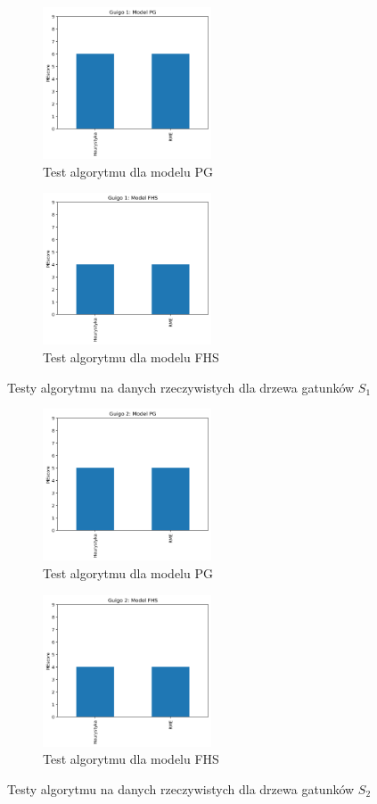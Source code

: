 \documentclass[licencjacka]{pracamgr}
\begin{document}
\begin{figure}[H]
\centering
\begin{subfigure}{.5\textwidth}
  \centering
  \includegraphics[width=50mm]{./pictures/G1_PG.png}
  \caption{Test algorytmu dla modelu PG}
  \label{fig:sub2}
\end{subfigure}%
\begin{subfigure}{.5\textwidth}
  \centering
  \includegraphics[width=50mm]{./pictures/G1_FHS.png}
  \caption{Test algorytmu dla modelu FHS}
  \label{fig:sub1}
\end{subfigure}%
\caption{Testy algorytmu na danych rzeczywistych dla drzewa gatunków $S_1$}
\label{fig:test}
\end{figure}


\begin{figure}[H]
\centering
\begin{subfigure}{.5\textwidth}
  \centering
  \includegraphics[width=50mm]{./pictures/G2_PG.png}
  \caption{Test algorytmu dla modelu PG}
  \label{fig:sub2}
\end{subfigure}%
\begin{subfigure}{.5\textwidth}
  \centering
  \includegraphics[width=50mm]{./pictures/G2_FHS.png}
  \caption{Test algorytmu dla modelu FHS}
  \label{fig:sub1}
\end{subfigure}%
\caption{Testy algorytmu na danych rzeczywistych dla drzewa gatunków $S_2$}
\label{fig:test}
\end{figure}
\end{document}
